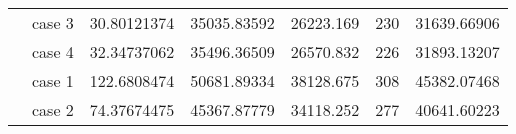 \begin{table}[]
\begin{tabular}{cllllll}
    \rowcolor[HTML]{FFFFC7} 
    \cellcolor[HTML]{FFFFC7}                                                                                               & case 3                  & 30.80121374                                                                            & 35035.83592                                                                               & 26223.169                                                                           & 230                                                                        & 31639.66906                                                                                \\ \cline{2-7} 
    \rowcolor[HTML]{FFFFC7} 
    \multirow{-4}{*}{\cellcolor[HTML]{FFFFC7}6000}                                                                         & case 4                  & 32.34737062                                                                            & 35496.36509                                                                               & 26570.832                                                                           & 226                                                                        & 31893.13207                                                                                \\ \hline
    \rowcolor[HTML]{FFFFC7} 
    \cellcolor[HTML]{FFFFC7}                                                                                               & case 1                  & 122.6808474                                                                            & 50681.89334                                                                               & 38128.675                                                                           & 308                                                                        & 45382.07468                                                                                \\ \cline{2-7} 
    \rowcolor[HTML]{FFFFC7} 
    \cellcolor[HTML]{FFFFC7}                                                                                               & case 2                  & 74.37674475                                                                            & 45367.87779                                                                               & 34118.252                                                                           & 277                                                                        & 40641.60223                                                                                \\ \cline{2-7} 

\end{tabular}
\end{table}
